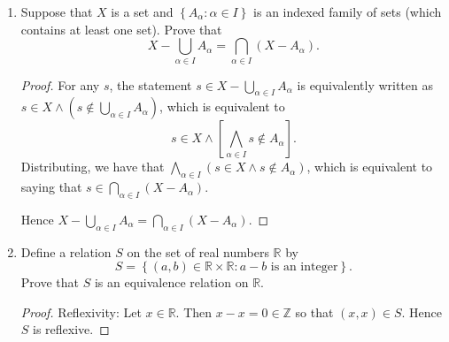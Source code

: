\documentclass[11pt]{article}
\newcommand{\sbr}[1]{\left[#1\right]}
\newcommand{\cbr}[1]{\left\{#1\right\}}
\begin{document}
\begin{enumerate}
\begin{enumerate}[label=(\alph*)]
\begin{proof}
            Hence $A\times B$ is finite while $A$ is infinite.
        \end{proof}
        \item If $A$ and $B$ are nonempty and $A\times B$ is finite then both $A$ and $B$ are finite.
        \textbf{TRUE} \begin{proof}
            Let $A, B$ be nonempty sets. Then we prove the contrapositive. To that end, suppose either $A$ or $B$ is an infinite set. Without loss of generality let $A$ be an infinite set. Note that since $A,B$ are nonempty, $A\times B$ is nonempty.
            
            Choose one $b\in B$ (the set $B$ is nonempty). Then there are an infinite number of elements of the form $(a,b)$ for $a\in A$ in $A\times B$  since the number of options for $a$ is not finite, as $A$ is an infinite set.

            Thus $A\times B$ is necessarily an infinite set. By the contrapositive, when $A,B$ are nonempty, if $A\times B$ is finite then both $A$ and $B$ are finite.
        \end{proof}
    \end{enumerate}
    \item Suppose that $X$ is a set and $\cbr{A_\alpha\colon \alpha \in I}$ is an indexed family of sets (which contains at least one set). Prove that \[X-\bigcup_{\alpha\in I}A_{\alpha} = \bigcap_{\alpha\in I}(X-A_\alpha).\]
    \begin{proof}
        For any $s$, the statement $s\in X-\bigcup_{\alpha\in I} A_\alpha$ is equivalently written as $s\in X \land (s\not\in \bigcup_{\alpha\in I}A_\alpha)$, which is equivalent to \[s\in X \land \sbr{\bigwedge_{\alpha \in I}s\not\in A_{\alpha}}.\] Distributing, we have that $\bigwedge_{\alpha \in I}(s\in X \land s\not\in A_{\alpha})$, which is equivalent to saying that $s\in \bigcap_{\alpha\in I}(X-A_\alpha)$.

        Hence $X-\bigcup_{\alpha\in I}A_{\alpha} = \bigcap_{\alpha\in I}(X-A_\alpha)$.
    \end{proof}
    \item Define a relation $S$ on the set of real numbers $\mathbb{R}$ by \[S = \cbr{(a,b)\in \mathbb{R}\times \mathbb{R}\colon a-b \text{ is an integer}}.\] Prove that $S$ is an equivalence relation on $\mathbb{R}$.
    \begin{proof}
        Reflexivity: Let $x\in \mathbb{R}$. Then $x-x = 0\in \mathbb{Z}$ so that $(x,x)\in S$. Hence $S$ is reflexive.


\end{proof}
\end{enumerate}
\end{document}
